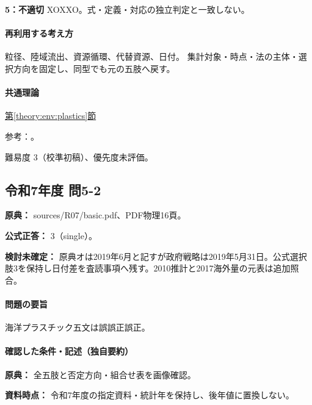 \noindent\textbf{5：不適切} XOXXO。式・定義・対応の独立判定と一致しない。\par

\paragraph{再利用する考え方} 粒径、陸域流出、資源循環、代替資源、日付。 集計対象・時点・法の主体・選択方向を固定し、同型でも元の五肢へ戻す。

\paragraph{共通理論} \hyperref[theory:env:plastics]{第\ref*{theory:env:plastics}節}

\par 参考：\cite{env59_plastic}。

\par 難易度 3（校準初稿）、優先度未評価。

\subsection{令和7年度 問5-2}
\label{q:r07-reg-basic-5-2}

\noindent\textbf{原典：} sources/R07/basic.pdf、PDF物理16頁。

\textbf{公式正答：} 3（single）。

\par\textbf{検討未確定：} 原典オは2019年6月と記すが政府戦略は2019年5月31日。公式選択肢3を保持し日付差を査読事項へ残す。2010推計と2017海外量の元表は追加照合。

\paragraph{問題の要旨} 海洋プラスチック五文は誤誤正誤正。

\paragraph{確認した条件・記述（独自要約）}\mbox{}\par

\noindent\textbf{原典：} 全五肢と否定方向・組合せ表を画像確認。\par

\noindent\textbf{資料時点：} 令和7年度の指定資料・統計年を保持し、後年値に置換しない。\par

